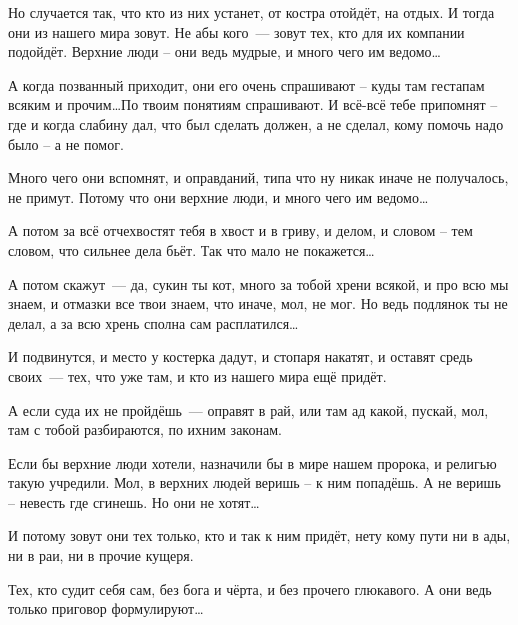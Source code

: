 Но случается так, что кто из них устанет, от костра отойдёт, на отдых. И тогда они из нашего мира зовут. Не абы кого~--- зовут тех, кто для их компании подойдёт. Верхние люди -- они ведь мудрые, и много чего им ведомо\dots

А когда позванный приходит, они его очень спрашивают -- куды там гестапам всяким и прочим\dots По твоим понятиям спрашивают. И всё-всё тебе припомнят -- где и когда слабину дал, что был сделать должен, а не сделал, кому помочь надо было -- а не помог.

Много чего они вспомнят, и оправданий, типа что ну никак иначе не получалось, не примут. Потому что они верхние люди, и много чего им ведомо\dots

А потом за всё отчехвостят тебя в хвост и в гриву, и делом, и словом -- тем словом, что сильнее дела бьёт. Так что мало не покажется\dots

А потом скажут~--- да, сукин ты кот, много за тобой хрени всякой, и про всю мы знаем, и отмазки все твои знаем, что иначе, мол, не мог. Но ведь подлянок ты не делал, а за всю хрень сполна сам расплатился\dots

И подвинутся, и место у костерка дадут, и стопаря накатят, и оставят средь своих~--- тех, что уже там, и кто из нашего мира ещё придёт.

А если суда их не пройдёшь~--- оправят в рай, или там ад какой, пускай, мол, там с тобой разбираются, по ихним законам.

Если бы верхние люди хотели, назначили бы в мире нашем пророка, и религью такую учредили. Мол, в верхних людей веришь -- к ним попадёшь. А не веришь -- невесть где сгинешь. Но они не хотят\dots

И потому зовут они тех только, кто и так к ним придёт, нету кому пути ни в ады, ни в раи, ни в прочие кущеря.

Тех, кто судит себя сам, без бога и чёрта, и без прочего глюкавого. А они ведь только приговор формулируют\dots